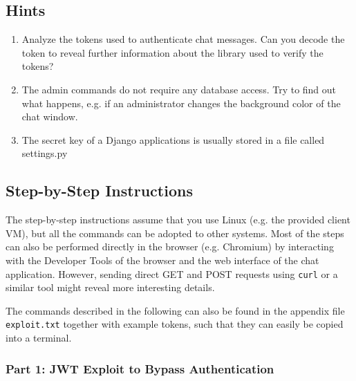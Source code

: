 \documentclass[12pt,a4paper]{article}
\newcommand{\code}[1]{\texttt{#1}}
\begin{document}
\subsection{Hints}
\begin{enumerate}
	\item Analyze the tokens used to authenticate chat messages. Can you decode the token to reveal further information about the library used to verify the tokens?
	\item The admin commands do not require any database access. Try to find out what happens, e.g. if an administrator changes the background color of the chat window.
	\item The secret key of a Django applications is usually stored in a file called settings.py
\end{enumerate}

\subsection{Step-by-Step Instructions}

The step-by-step instructions assume that you use Linux (e.g. the provided client VM), but all the commands can be adopted to other systems. Most of the steps can also be performed directly in the browser (e.g. Chromium) by interacting with the Developer Tools of the browser and the web interface of the chat application. However, sending direct GET and POST requests using \code{curl} or a similar tool might reveal more interesting details.

The commands described in the following can also be found in the appendix file \code{exploit.txt} together with example tokens, such that they can easily be copied into a terminal.

\subsubsection{Part 1: JWT Exploit to Bypass Authentication}
\end{document}
